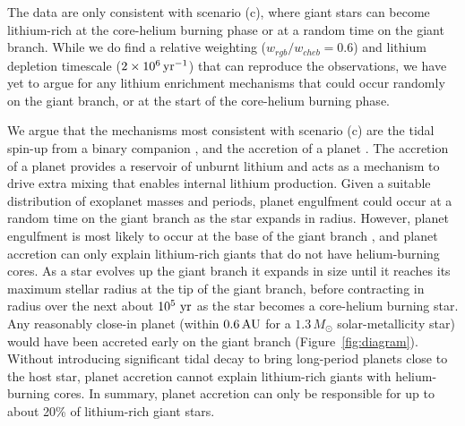 \documentclass[twocolumn]{aastex62}
\begin{document}
The data are only consistent with scenario (c), where giant stars can become
lithium-rich at the core-helium burning phase or at a random time on the giant
branch. While we do find a relative weighting ($w_{rgb}/w_{cheb} = 0.6$) and lithium
depletion timescale ($2\times10^6\,{\rm yr}^{-1}$) that can reproduce the
observations, we have yet to argue for any lithium enrichment mechanisms that 
could occur randomly on the giant branch, or at the start of the core-helium
burning phase.


We argue that the mechanisms most consistent with scenario (c) are the 
tidal spin-up from a binary companion \citep{Fekel_1993}, and the accretion 
of a planet \citep{Siess_1999}. The accretion of a planet provides a reservoir
of unburnt lithium and acts as a mechanism to drive extra mixing that 
enables internal lithium production. 
Given a suitable distribution of exoplanet masses and periods, planet engulfment
could occur at a random time on the giant branch as the star expands in radius.
However, planet engulfment is most likely to occur at the base of
the giant branch \citep{Schlaufman}, and planet accretion can 
only
explain lithium-rich giants that do not have helium-burning cores. As a star evolves up the giant branch it expands in size until it reaches its maximum stellar radius at 
the tip of the giant branch, before contracting in radius over the next 
about $10^5~{\rm yr}$ as the star becomes a core-helium burning star. 
Any reasonably close-in planet (within $0.6\,{\rm AU}$ for a $1.3\,M_\odot$ solar-metallicity star) would have been accreted early on the giant branch (Figure~\ref{fig:diagram}).
Without 
introducing significant tidal decay to bring long-period planets close to the host star, planet accretion cannot explain lithium-rich giants with helium-burning cores.
In summary, planet accretion can only be responsible for up to about 20\% of lithium-rich giant stars. 
\end{document}

